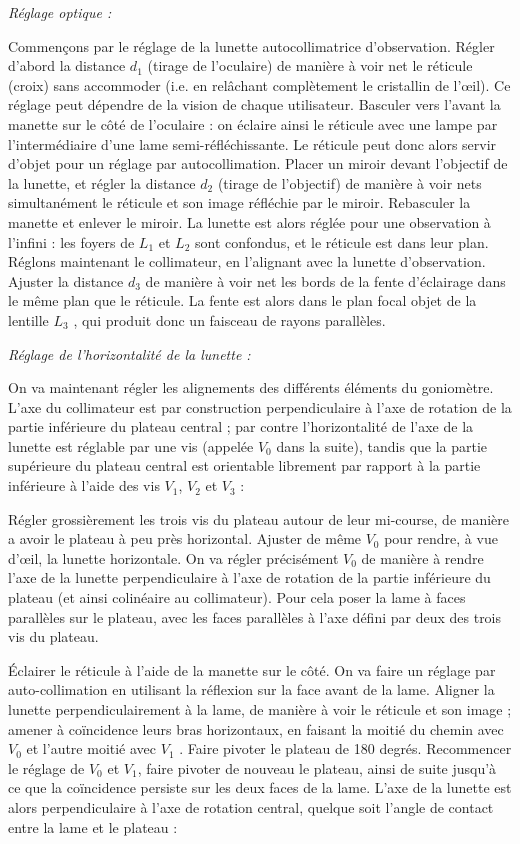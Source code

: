 \documentclass{article}%
\begin{document}
\textit{Réglage optique :}

Commençons par le réglage de la lunette autocollimatrice d’observation. Régler d’abord la distance $d_1$ (tirage de l’oculaire) de manière à voir net le réticule (croix) sans accommoder (i.e. en relâchant complètement le cristallin de l’œil). Ce réglage peut dépendre de la vision de chaque utilisateur. Basculer vers l’avant la manette sur le côté de l’oculaire : on éclaire ainsi le réticule avec une lampe par l’intermédiaire d’une lame semi-réfléchissante. Le réticule peut donc alors servir d’objet pour un réglage par autocollimation. Placer un miroir devant l’objectif de la lunette, et régler la distance $d_2$ (tirage de l’objectif) de manière à voir nets simultanément le réticule et son image réfléchie par le miroir. Rebasculer la manette et enlever le miroir. La lunette est alors réglée pour une observation à l’infini : les foyers de $L_1$ et $L_2$ sont confondus, et le réticule est dans leur plan. Réglons maintenant le collimateur, en l’alignant avec la lunette d’observation. Ajuster la distance $d_3$ de manière à voir net les bords de la fente d’éclairage dans le même plan que le réticule. La fente est alors dans le plan focal objet de la lentille $L_3$ , qui produit donc un faisceau de rayons parallèles.

\textit{Réglage de l'horizontalité de la lunette :}

On va maintenant régler les alignements des différents éléments du goniomètre. L’axe du collimateur est par construction perpendiculaire à l’axe de rotation de la partie inférieure du plateau central ; par contre l’horizontalité de l’axe de la lunette est réglable par une vis (appelée $V_0$ dans la suite), tandis que la partie supérieure du plateau central est orientable librement par rapport à la partie inférieure à l’aide des vis $V_1$, $V_2$ et $V_3$ :

Régler grossièrement les trois vis du plateau autour de leur mi-course, de manière a avoir le plateau à peu près horizontal. Ajuster de même $V_0$ pour rendre, à vue d’œil, la lunette horizontale. On va régler précisément $V_0$ de manière à rendre l’axe de la lunette perpendiculaire à l’axe de rotation de la partie inférieure du plateau (et ainsi colinéaire au collimateur). Pour cela poser la lame à faces parallèles sur le plateau, avec les faces parallèles à l’axe défini par deux des trois vis du plateau.


Éclairer le réticule à l’aide de la manette sur le côté. On va faire un réglage par auto-collimation en utilisant la réflexion sur la face avant de la lame. Aligner la lunette perpendiculairement à la lame, de manière à voir le réticule et son image ; amener à coïncidence leurs bras horizontaux, en faisant la moitié du chemin avec $V_0$ et l’autre moitié avec $V_1$ . Faire pivoter le plateau de 180 degrés. Recommencer le réglage de $V_0$ et $V_1$, faire pivoter de nouveau le plateau, ainsi de suite jusqu’à ce que la coïncidence persiste sur les deux faces de la lame. L’axe de la lunette est alors perpendiculaire à l’axe de rotation central, quelque soit l’angle de contact entre la lame et le plateau :
\end{document}
